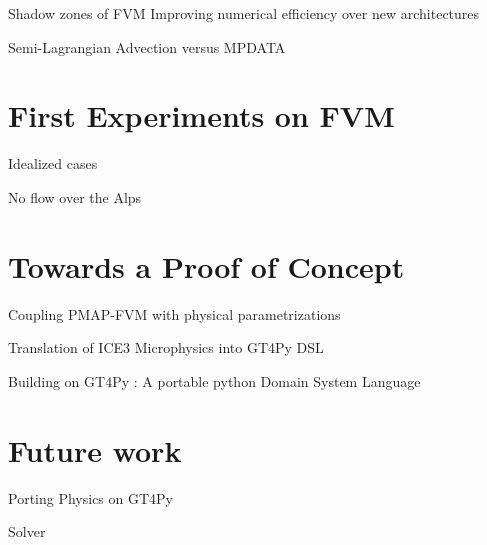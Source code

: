 \documentclass{beamer}
\begin{document}
\begin{frame}{Shadow zones of FVM}
    Improving numerical efficiency over new architectures 
    
\end{frame}



\begin{frame}{Semi-Lagrangian Advection versus MPDATA}
\end{frame}




\section{First Experiments on FVM}

\begin{frame}{Idealized cases}
\end{frame}

\begin{frame}{No flow over the Alps}
\end{frame}

\section{Towards a Proof of Concept}

\begin{frame}{Coupling PMAP-FVM with physical parametrizations}

Translation of ICE3 Microphysics into GT4Py DSL
\end{frame}

\begin{frame}{Building on GT4Py : A portable python Domain System Language}


\end{frame}


\section{Future work}
\begin{frame}{Porting Physics on GT4Py}


\end{frame}

\begin{frame}{Solver}
\end{frame}
\end{document}
